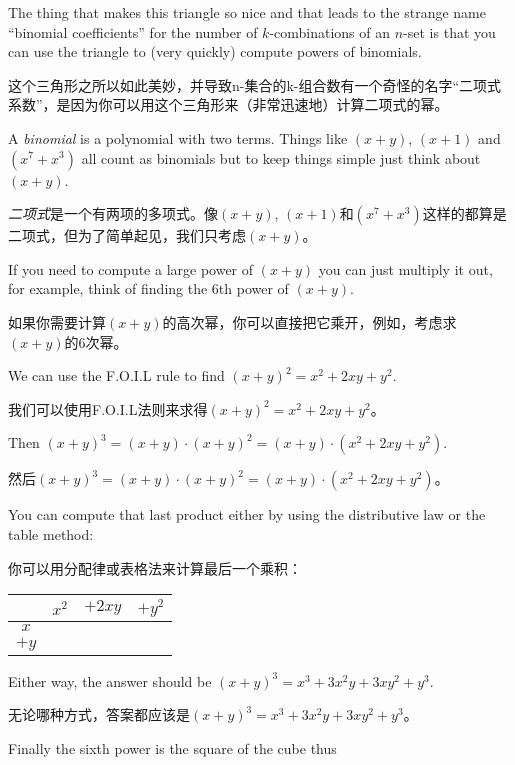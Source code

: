 The thing that makes this triangle so nice and that leads to the
strange name ``binomial coefficients'' for the number of $k$-combinations
of an $n$-set is that you can use the triangle to (very quickly) compute
powers of binomials.

这个三角形之所以如此美妙，并导致n-集合的k-组合数有一个奇怪的名字“二项式系数”，是因为你可以用这个三角形来（非常迅速地）计算二项式的幂。

A \emph{binomial} is a polynomial with two terms.
Things like $(x+y)$, $(x+1)$ and $(x^7+x^3)$ all count as binomials
but to keep things simple just think about $(x+y)$.

\emph{二项式}是一个有两项的多项式。像$(x+y)$, $(x+1)$和$(x^7+x^3)$这样的都算是二项式，但为了简单起见，我们只考虑$(x+y)$。

If you need to
compute a large power of $(x+y)$ you can just multiply it out, for
example, think of finding the 6th power of $(x+y)$.

如果你需要计算$(x+y)$的高次幂，你可以直接把它乘开，例如，考虑求$(x+y)$的6次幂。

We can use the F.O.I.L rule to find $(x+y)^2 = x^2 + 2xy + y^2$.

我们可以使用F.O.I.L法则来求得$(x+y)^2 = x^2 + 2xy + y^2$。

Then $(x+y)^3 =  (x+y) \cdot (x+y)^2 = (x+y) \cdot  (x^2 + 2xy + y^2)$.

然后$(x+y)^3 = (x+y) \cdot (x+y)^2 = (x+y) \cdot (x^2 + 2xy + y^2)$。

You can compute that last product either by using the distributive law
or the table method:

你可以用分配律或表格法来计算最后一个乘积：

\begin{center}
\begin{tabular}{c|ccc}
      & $x^2$ & $+ 2xy$ & $+ y^2$ \\ \hline
$x$   &       &         &         \\
$+ y$ &       &         &         \\
\end{tabular} 
\end{center}

Either way, the answer should be $(x+y)^3 = x^3 + 3x^2y + 3xy^2 + y^3$.

无论哪种方式，答案都应该是$(x+y)^3 = x^3 + 3x^2y + 3xy^2 + y^3$。

Finally the sixth power is the square of the cube thus

